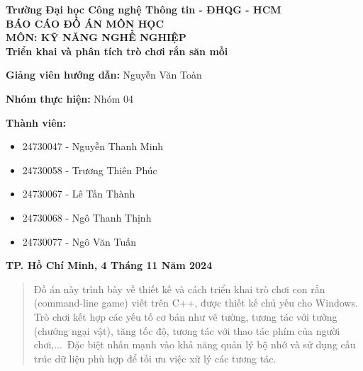 \documentclass[12pt]{report}
\begin{document}
\begin{titlepage}
    \begin{center}
        {\Large\textbf{Trường Đại học Công nghệ Thông tin - ĐHQG - HCM}}\\[0.5cm]
        
        \textbf{\Huge BÁO CÁO ĐỒ ÁN MÔN HỌC}\\[0.5cm]
        {\Large\textbf{MÔN: KỸ NĂNG NGHỀ NGHIỆP}}\\[2cm]
        
        {\LARGE\textbf{Triển khai và phân tích trò chơi rắn săn mồi}}\\[1.5cm]

        \begin{flushleft}
            \large
            \textbf{Giảng viên hướng dẫn: }
            Nguyễn Văn Toàn
        \end{flushleft}
        
        \begin{flushleft}
            \large
            \textbf{Nhóm thực hiện:} Nhóm 04
        \end{flushleft}
        
        \begin{flushleft}
            \large
            \textbf{Thành viên:}
            \begin{itemize}
                \item 24730047 - Nguyễn Thanh Minh
                \item 24730058 - Trương Thiên Phúc
                \item 24730067 - Lê Tấn Thành
                \item 24730068 - Ngô Thanh Thịnh
                \item 24730077 - Ngô Văn Tuấn
            \end{itemize}
        \end{flushleft}
        
        
        \vfill
        
        {\Large\textbf{TP. Hồ Chí Minh, 4 Tháng 11 Năm 2024}}
        
    \end{center}
\end{titlepage}

\begin{abstract}
    Đồ án này trình bày về thiết kế và cách triển khai trò chơi con rắn (command-line game) viết trên C++, được thiết kế chủ yếu cho Windows. Trò chơi kết hợp các yếu tố cơ bản như vẽ tường, tương tác với tường (chướng ngại vật), tăng tốc độ, tương tác với thao tác phím của người chơi,...\
    Đặc biệt nhấn mạnh vào khả năng quản lý bộ nhớ và sử dụng cấu trúc dữ liệu phù hợp để tối ưu việc xử lý các tương tác.
\end{abstract}
\end{document}
